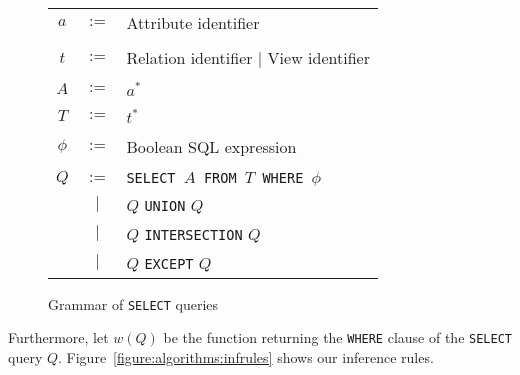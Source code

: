 \begin{figure}[!ht]

\begin{tabular}{c c l}
$a$ & $:=$ & Attribute identifier \\
    & & \\
$t$ & $:=$ & Relation identifier $|$ View identifier \\ \\

$A$ & $:=$ & $a^*$ \\
    & & \\
$T$ & $:=$ &  $t^*$ \\
    & & \\
$\phi$ & $:=$ & Boolean SQL expression  \\
    & & \\
$Q$ & $:=$ & \texttt{SELECT $A$ FROM $T$ WHERE $\phi$} \\
    & $|$  & $Q$ \texttt{UNION} $Q$ \\
    & $|$  & $Q$ \texttt{INTERSECTION} $Q$ \\
    & $|$  & $Q$ \texttt{EXCEPT} $Q$ \\

\end{tabular}
\caption{Grammar of \texttt{SELECT} queries}
\label{figure:algorithms:grammar}
\end{figure}
%
Furthermore, let $w(Q)$ be the function returning the \texttt{WHERE} clause of the \texttt{SELECT} query $Q$.
%
Figure~\ref{figure:algorithms:infrules} shows our inference rules.
%
